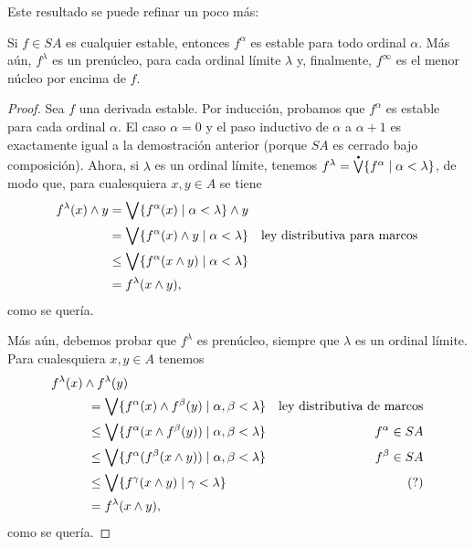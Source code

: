 Este resultado se puede refinar un poco más:
\begin{lemma}
  Si $f\in SA$ es cualquier estable, entonces $f^\alpha$ es
  estable para todo ordinal $\alpha$.
  Más aún, $f^\lambda$ es un prenúcleo, para cada ordinal límite
  $\lambda$ y, finalmente, $f^\infty$ es el menor núcleo por
  encima de $f$.
\end{lemma}
\begin{proof}
  Sea $f$ una derivada estable.
  Por inducción, probamos que $f^\alpha$ es estable para cada
  ordinal $\alpha$.
  El caso $\alpha=0$ y el paso inductivo de $\alpha$ a $\alpha+1$
  es exactamente igual a la demostración anterior (porque $SA$ es
  cerrado bajo composición).
  Ahora, si $\lambda$ es un ordinal límite, tenemos
  $f^\lambda = \pSup\{f^\alpha \mid \alpha < \lambda\}$, de modo
  que, para cualesquiera $x,y\in A$ se tiene
  \begin{align*}
    f^\lambda(x)\wedge y
    &= \bigvee\{f^\alpha(x) \mid \alpha <\lambda\} \wedge y \\
    &= \bigvee\{f^\alpha(x)\wedge y\mid \alpha <\lambda\}
      & \text{ley distributiva para marcos} \\
    &\leq \bigvee\{f^\alpha(x\wedge y)\mid \alpha <\lambda\} \\
    &= f^\lambda(x\wedge y),
  \end{align*}
  como se quería.

  Más aún, debemos probar que $f^\lambda$ es prenúcleo, siempre
  que $\lambda$ es un ordinal límite.
  Para cualesquiera $x,y\in A$ tenemos
  \begin{align*}
    &f^\lambda(x)\inf f^\lambda(y) \\
    &\hspace{10mm}
    = \Sup\{f^\alpha(x)\inf f^\beta(y) \mid \alpha,\beta <\lambda\}
      & \text{ley distributiva de marcos} \\
    &\hspace{10mm}
    \leq \Sup\{f^\alpha(x\inf f^\beta(y)) \mid \alpha,\beta <\lambda\}
      & f^\alpha \in SA \\
    &\hspace{10mm}
    \leq \Sup\{f^\alpha(f^\beta(x\inf y)) \mid \alpha,\beta <\lambda\}
      & f^\beta \in SA \\
    &\hspace{10mm}
    \leq \Sup\{f^\gamma(x\inf y) \mid \gamma<\lambda\}
      & (?) \\
    &\hspace{10mm}
    = f^\lambda(x\inf y),
  \end{align*}
  como se quería.
\end{proof}

